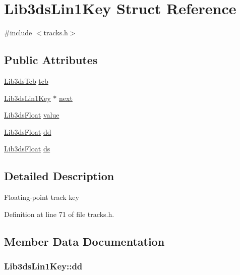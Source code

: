 \hypertarget{struct_lib3ds_lin1_key}{\section{Lib3ds\-Lin1\-Key Struct Reference}
\label{struct_lib3ds_lin1_key}
}


{\ttfamily \#include $<$tracks.\-h$>$}

\subsection*{Public Attributes}
\begin{DoxyCompactItemize}
\item 
\hyperlink{struct_lib3ds_tcb}{Lib3ds\-Tcb} \hyperlink{struct_lib3ds_lin1_key_ab1ac20f75e6af79b27af9e835f7ac4dc}{tcb}
\item 
\hyperlink{struct_lib3ds_lin1_key}{Lib3ds\-Lin1\-Key} $\ast$ \hyperlink{struct_lib3ds_lin1_key_a10149328e4a22a442277a53fb01a9095}{next}
\item 
\hyperlink{types_8h_ab18e70f51f9a53c9dee8d930c8e1a7bf}{Lib3ds\-Float} \hyperlink{struct_lib3ds_lin1_key_a834374640e73d4b8ca8fd1dafd236ae0}{value}
\item 
\hyperlink{types_8h_ab18e70f51f9a53c9dee8d930c8e1a7bf}{Lib3ds\-Float} \hyperlink{struct_lib3ds_lin1_key_a121aef0b7ae1d1c6ed4db845f66efc89}{dd}
\item 
\hyperlink{types_8h_ab18e70f51f9a53c9dee8d930c8e1a7bf}{Lib3ds\-Float} \hyperlink{struct_lib3ds_lin1_key_a082f7b2c95af7febffb0c08cf21338be}{ds}
\end{DoxyCompactItemize}


\subsection{Detailed Description}
Floating-\/point track key 

Definition at line 71 of file tracks.\-h.



\subsection{Member Data Documentation}
\hypertarget{struct_lib3ds_lin1_key_a121aef0b7ae1d1c6ed4db845f66efc89}{
\subsubsection[{dd}]{ Lib3ds\-Lin1\-Key\-::dd}}\label{struct_lib3ds_lin1_key_a121aef0b7ae1d1c6ed4db845f66efc89}


